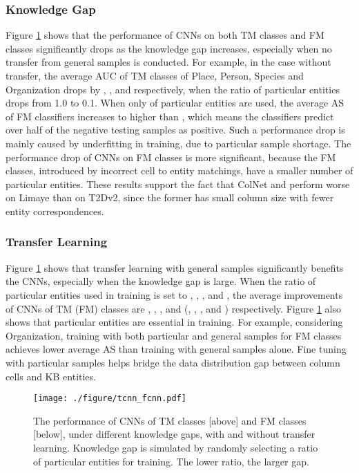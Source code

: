 \documentclass[letterpaper]{article}
\newcommand{\ernesto}[1]{{\color{black}#1}}
\newcommand{\rv}[1]{{\color{black}#1}}
\newcommand{\camera}[1]{{\color{black}#1}}
\newcommand{\ColNet}{\textsf{ColNet}\xspace}
\begin{document}
\subsubsection{Knowledge Gap}
Figure \ref{fig:tcnn_fcnn} 
\camera{shows}
that the performance of CNNs \camera{on} both TM classes and FM classes significantly drops as \rv{the knowledge gap increases,
especially when no transfer from general samples is conducted.}
For example,
in the case without transfer,
the average AUC of TM classes of Place, Person, Species and Organization drops by , ,  and  respectively,
when \ernesto{the ratio of particular entities drops from 1.0 to 0.1}.
\rv{When only  of particular entities are used,
the average AS of FM classifiers} increases to higher than ,
which means the classifiers predict over half of the negative testing samples as positive.
\rv{Such a performance drop is 
mainly caused by underfitting in training, due to particular sample shortage.}
The performance drop of CNNs \camera{on} FM classes is more significant,
\camera{because} the FM classes, 
introduced by incorrect cell to entity matchings, 
have a smaller number of particular entities.
These results \camera{support} the fact that \ColNet and  perform worse on Limaye than on T2Dv2, \camera{since the} former has \camera{small} column size with fewer entity correspondences.

\subsubsection{Transfer Learning}\label{sec:transfer}

Figure \ref{fig:tcnn_fcnn} shows that transfer learning  with general samples significantly benefits the CNNs,
especially when the knowledge gap is large.
\rv{When the \ernesto{ratio} of particular entities used in training is set to , , ,  and ,
the average improvements of CNNs of TM (FM) classes are , , ,  and 
(, , ,  and ) respectively.
}
Figure \ref{fig:tcnn_fcnn} 
\camera{also shows}
that particular entities are essential in training.
For example, considering Organization,
training with both particular and general samples for FM classes achieves  lower average AS than training with general samples alone.
\camera{Fine tuning} with particular samples helps bridge the data distribution gap between column cells and KB entities.



\begin{figure}[!t]
\centering
\texttt{[image: ./figure/tcnn\_fcnn.pdf]}
\caption{The performance of CNNs of TM classes [above] and FM classes [below], under different knowledge gaps, with and without transfer learning.
Knowledge gap is simulated by \rv{randomly selecting a ratio of} particular entities for training.
The lower ratio, the larger gap.
}
\label{fig:tcnn_fcnn}
\end{figure}
\end{document}
